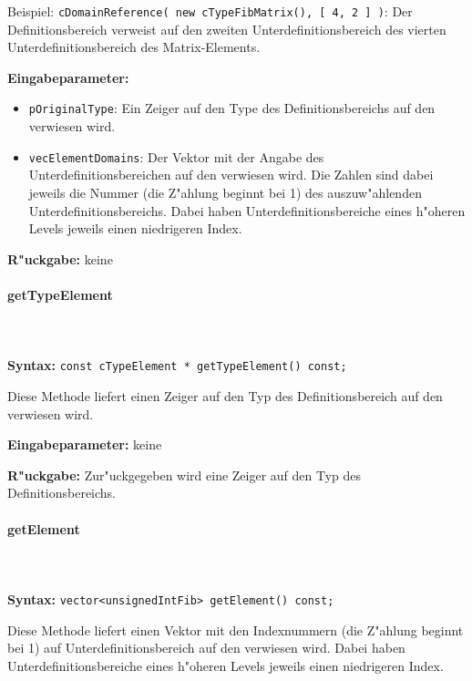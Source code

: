 \bigskip\noindent
Beispiel:
\verb|cDomainReference( new cTypeFibMatrix(), [ 4, 2 ] )|: Der Definitionsbereich verweist auf den zweiten Unterdefinitionsbereich des vierten Unterdefinitionsbereich des Matrix-Elements.

\bigskip\noindent
\textbf{Eingabeparameter:}
\begin{itemize}
 \item \verb|pOriginalType|: Ein Zeiger auf den Type des Definitionsbereichs auf den verwiesen wird.
 \item \verb|vecElementDomains|: Der Vektor mit der Angabe des Unterdefinitionsbereichen auf den verwiesen wird. Die Zahlen sind dabei jeweils die Nummer (die Z"ahlung beginnt bei 1) des auszuw"ahlenden Unterdefinitionsbereichs. Dabei haben Unterdefinitionsbereiche eines h"oheren Levels jeweils einen niedrigeren Index.
\end{itemize}

\bigskip\noindent
\textbf{R"uckgabe:} keine


\paragraph{getTypeElement}

\ \\\\\noindent
\textbf{Syntax:} \verb|const cTypeElement * getTypeElement() const;|

\bigskip\noindent
Diese Methode liefert einen Zeiger auf den Typ des Definitionsbereich auf den verwiesen wird.

\bigskip\noindent
\textbf{Eingabeparameter:} keine

\bigskip\noindent
\textbf{R"uckgabe:} Zur"uckgegeben wird eine Zeiger auf den Typ des Definitionsbereichs.


\paragraph{getElement}

\ \\\\\noindent
\textbf{Syntax:} \verb|vector<unsignedIntFib> getElement() const;|

\bigskip\noindent
Diese Methode liefert einen Vektor mit den Indexnummern (die Z"ahlung beginnt bei 1) auf Unterdefinitionsbereich auf den verwiesen wird.
Dabei haben Unterdefinitionsbereiche eines h"oheren Levels jeweils einen niedrigeren Index.


